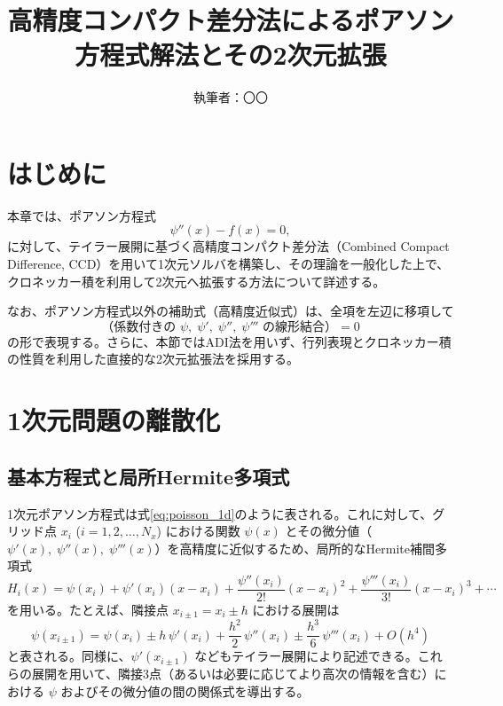 \documentclass[11pt]{article}
\title{高精度コンパクト差分法によるポアソン方程式解法とその2次元拡張}
\author{執筆者：〇〇}
\date{}
\begin{document}
\maketitle

\tableofcontents
\newpage

\section{はじめに}
本章では、ポアソン方程式
\begin{equation}
  \psi''(x) - f(x) = 0,
  \label{eq:poisson_1d}
\end{equation}
に対して、テイラー展開に基づく高精度コンパクト差分法（Combined Compact Difference, CCD）を用いて1次元ソルバを構築し、その理論を一般化した上で、クロネッカー積を利用して2次元へ拡張する方法について詳述する。\newline

なお、ポアソン方程式以外の補助式（高精度近似式）は、全項を左辺に移項して
\[
\text{（係数付きの } \psi,\; \psi',\; \psi'',\; \psi''' \text{ の線形結合）} = 0
\]
の形で表現する。さらに、本節ではADI法を用いず、行列表現とクロネッカー積の性質を利用した直接的な2次元拡張法を採用する。

\section{1次元問題の離散化}
\subsection{基本方程式と局所Hermite多項式}
1次元ポアソン方程式は式\eqref{eq:poisson_1d}のように表される。これに対して、グリッド点 $x_i$ ($i=1,2,\dots,N_x$) における関数 $\psi(x)$ とその微分値（$\psi'(x),\;\psi''(x),\;\psi'''(x)$）を高精度に近似するため、局所的なHermite補間多項式
\begin{equation}
  H_i(x) = \psi(x_i) + \psi'(x_i)(x-x_i) + \frac{\psi''(x_i)}{2!}(x-x_i)^2 + \frac{\psi'''(x_i)}{3!}(x-x_i)^3 + \cdots
  \label{eq:hermite}
\end{equation}
を用いる。たとえば、隣接点 $x_{i\pm1}= x_i \pm h$ における展開は
\begin{equation}
  \psi(x_{i\pm1}) = \psi(x_i) \pm h\,\psi'(x_i) + \frac{h^2}{2}\,\psi''(x_i) \pm \frac{h^3}{6}\,\psi'''(x_i) + O(h^4)
  \label{eq:taylor}
\end{equation}
と表される。同様に、$\psi'(x_{i\pm1})$ などもテイラー展開により記述できる。これらの展開を用いて、隣接3点（あるいは必要に応じてより高次の情報を含む）における $\psi$ およびその微分値の間の関係式を導出する。
\end{document}
